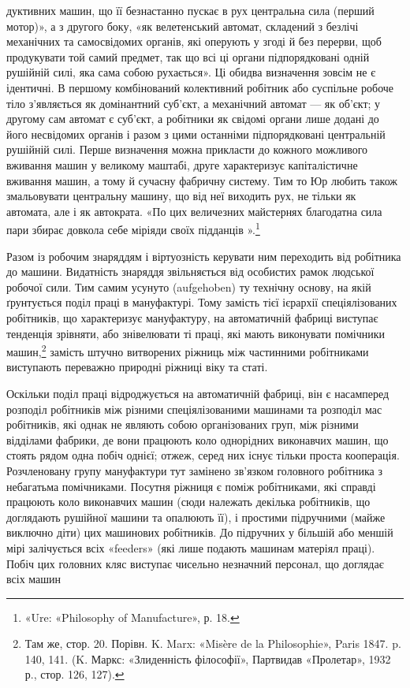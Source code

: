 дуктивних машин, що її безнастанно пускає в рух центральна
сила (перший мотор)», а з другого боку, «як велетенський автомат,
складений з безлічі механічних та самосвідомих органів,
які оперують у згоді й без перерви, щоб продукувати той самий
предмет, так що всі ці органи підпорядковані одній рушійній
силі, яка сама собою рухається». Ці обидва визначення зовсім
не є ідентичні. В першому комбінований колективний робітник
або суспільне робоче тіло з’являється як домінантний суб’єкт,
а механічний автомат — як об’єкт; у другому сам автомат є
суб’єкт, а робітники як свідомі органи лише додані до його
несвідомих органів і разом з цими останніми підпорядковані
центральній рушійній силі. Перше визначення можна прикласти
до кожного можливого вживання машин у великому маштабі,
друге характеризує капіталістичне вживання машин, а тому й
сучасну фабричну систему. Тим то Юр любить також змальовувати
центральну машину, що від неї виходить рух, не тільки як
автомата, але і як автократа. «По цих величезних майстернях
благодатна сила пари збирає довкола себе міріяди своїх підданців
».\footnote{
«Ure: «Philosophy of Manufacture», р. 18.
}

Разом із робочим знаряддям і віртуозність керувати ним
переходить від робітника до машини. Видатність знаряддя звільняється
від особистих рамок людської робочої сили. Тим самим
усунуто (aufgehoben) ту технічну основу, на якій ґрунтується
поділ праці в мануфактурі. Тому замість тієї ієрархії спеціялізованих
робітників, що характеризує мануфактуру, на автоматичній
фабриці виступає тенденція зрівняти, або знівелювати ті
праці, які мають виконувати помічники машин,\footnote{
Там же, стор. 20. Порівн. K. Marx: «Misère de la Philosophie»,
Paris 1847. p. 140, 141. (K. Маркс: «Злиденність філософії», Партвидав
«Пролетар», 1932 р., стор. 126, 127).
} замість штучно
витворених ріжниць між частинними робітниками виступають
переважно природні ріжниці віку та статі.

Оскільки поділ праці відроджується на автоматичній фабриці,
він є насамперед розподіл робітників між різними спеціялізованими
машинами та розподіл мас робітників, які однак не являють
собою організованих груп, між різними відділами фабрики, де
вони працюють коло однорідних виконавчих машин, що стоять
рядом одна побіч однієї; отжеж, серед них існує тільки проста
кооперація. Розчленовану групу мануфактури тут замінено
зв’язком головного робітника з небагатьма помічниками. Посутня
ріжниця є поміж робітниками, які справді працюють коло виконавчих
машин (сюди належать декілька робітників, що доглядають
рушійної машини та опалюють її), і простими підручними
(майже виключно діти) цих машинових робітників. До підручних
у більшій або меншій мірі залічується всіх «feeders» (які
лише подають машинам матеріял праці). Побіч цих головних кляс
виступає чисельно незначний персонал, що доглядає всіх машин